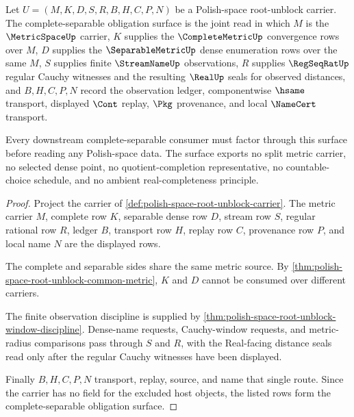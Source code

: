 \begin{theorem}
\label{thm:polishspace-complete-separable-obligation-surface}
Let $U=(M,K,D,S,R,B,H,C,P,N)$ be a Polish-space root-unblock carrier. The complete-separable obligation surface is the joint read in which $M$ is the $\MetricSpaceUp$ carrier, $K$ supplies the $\CompleteMetricUp$ convergence rows over $M$, $D$ supplies the $\SeparableMetricUp$ dense enumeration rows over the same $M$, $S$ supplies finite $\StreamNameUp$ observations, $R$ supplies $\RegSeqRatUp$ regular Cauchy witnesses and the resulting $\RealUp$ seals for observed distances, and $B,H,C,P,N$ record the observation ledger, componentwise $\hsame$ transport, displayed $\Cont$ replay, $\Pkg$ provenance, and local $\NameCert$ transport.

Every downstream complete-separable consumer must factor through this surface before reading any Polish-space data. The surface exports no split metric carrier, no selected dense point, no quotient-completion representative, no countable-choice schedule, and no ambient real-completeness principle.
\end{theorem}
\begin{proof}
Project the carrier of \autoref{def:polish-space-root-unblock-carrier}. The metric carrier $M$, complete row $K$, separable dense row $D$, stream row $S$, regular rational row $R$, ledger $B$, transport row $H$, replay row $C$, provenance row $P$, and local name $N$ are the displayed rows.

The complete and separable sides share the same metric source. By \autoref{thm:polish-space-root-unblock-common-metric}, $K$ and $D$ cannot be consumed over different carriers.

The finite observation discipline is supplied by \autoref{thm:polish-space-root-unblock-window-discipline}. Dense-name requests, Cauchy-window requests, and metric-radius comparisons pass through $S$ and $R$, with the Real-facing distance seals read only after the regular Cauchy witnesses have been displayed.

Finally $B,H,C,P,N$ transport, replay, source, and name that single route. Since the carrier has no field for the excluded host objects, the listed rows form the complete-separable obligation surface.
\end{proof}

